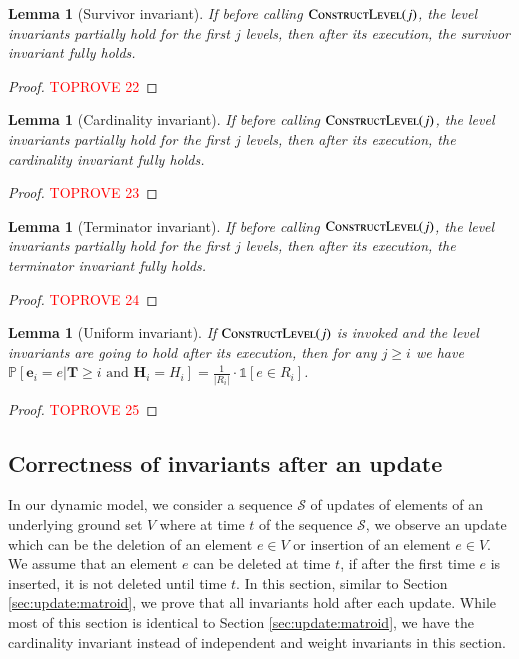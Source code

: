 \documentclass[11pt]{article}
\newtheorem{lemma}[theorem]{Lemma}
\renewcommand{\Pr}[1]{\ensuremath{\mathbb{P}\left[#1\right]}}
\newcommand{\ind}[1]{\ensuremath{\mathds{1}\left[#1\right]}}
\newcommand{\constLevel}{\textsc{ConstructLevel}}
\newcommand{\bE}{\ensuremath{\mathbf{e}}}
\newcommand{\bT}{\ensuremath{\mathbf{T}}}
\newcommand{\bH}{\ensuremath{\mathbf{H}}}
\begin{document}
\begin{lemma}[Survivor invariant]
\label{lm:cardinality:survivor:leveling}
If before calling $\constLevel{}(j)$, the level invariants partially hold for the first $j$ levels,
then after its execution, the survivor invariant fully holds.
\end{lemma}

\begin{proof}\textcolor{red}{TOPROVE 22}\end{proof}



\begin{lemma}[Cardinality invariant]
\label{lm:cardinality:cardinality:leveling}
If before calling $\constLevel{}(j)$, the level invariants partially hold for the first $j$ levels, 
then after its execution, the cardinality invariant fully holds. 
\end{lemma}

\begin{proof}\textcolor{red}{TOPROVE 23}\end{proof}
\begin{lemma}[Terminator invariant]
\label{lm:cardinality:terminator:leveling}
If before calling $\constLevel{}(j)$, the level invariants partially hold for the first $j$ levels,
then after its execution, the terminator invariant fully holds. 
\end{lemma}

\begin{proof}\textcolor{red}{TOPROVE 24}\end{proof}


\begin{lemma}[Uniform invariant]
\label{lm:cardinality:uniform:leveling}
If $\constLevel{}(j)$ is invoked and 
the level invariants are going to hold after its execution, then for any $j \ge i$ we have $ \Pr{\bE_i = e |  \bT \geq i \text{ and } \bH_i = H_i  }= \frac{1}{|R_i|}\cdot \ind{e\in R_i}  $.
\end{lemma}



\begin{proof}\textcolor{red}{TOPROVE 25}\end{proof}



\subsection{Correctness of invariants after an update}
In our dynamic model, 
we consider a sequence $\mathcal{S}$ of updates of elements of an underlying ground set $V$ 
where at time $t$ of the sequence $\mathcal{S}$, we observe an update which can be the deletion of an element $e \in V$ or insertion of an element $e \in V$. 
We assume that an element $e$ can be deleted at time $t$, if after the first time $e$ is inserted, it is not deleted until time $t$. 
In this section, similar to Section \ref{sec:update:matroid}, we prove that all invariants hold after each update.
While most of this section is identical to Section \ref{sec:update:matroid}, we have the cardinality invariant instead of independent and weight invariants in this section.
\end{document}
